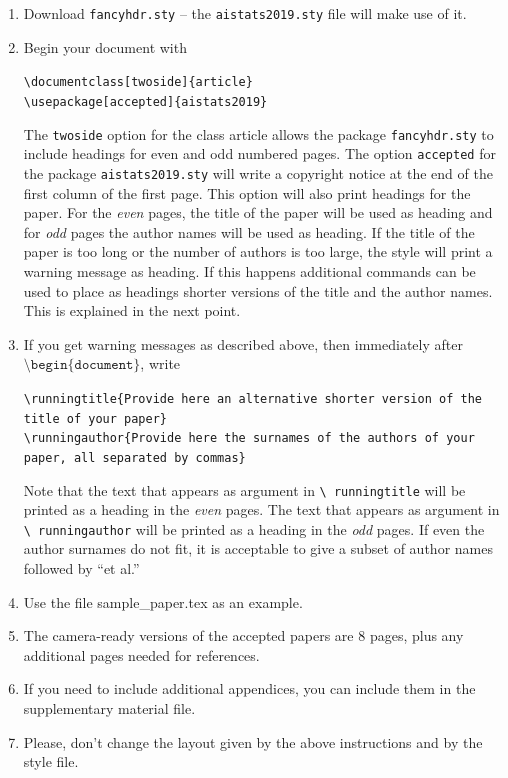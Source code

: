 \documentclass[twoside]{article}
\begin{document}
\begin{enumerate}
    \item Download \texttt{fancyhdr.sty} -- the
    \texttt{aistats2019.sty} file will make use of it.
    \item Begin your document with
    \begin{flushleft}
    \texttt{\textbackslash documentclass[twoside]\{article\}}\\
    \texttt{\textbackslash usepackage[accepted]\{aistats2019\}}
    \end{flushleft}
    The \texttt{twoside} option for the class article allows the
    package \texttt{fancyhdr.sty} to include headings for even and odd
    numbered pages. The option \texttt{accepted} for the package
    \texttt{aistats2019.sty} will write a copyright notice at the end of
    the first column of the first page. This option will also print
    headings for the paper.  For the \emph{even} pages, the title of
    the paper will be used as heading and for \emph{odd} pages the
    author names will be used as heading.  If the title of the paper
    is too long or the number of authors is too large, the style will
    print a warning message as heading. If this happens additional
    commands can be used to place as headings shorter versions of the
    title and the author names. This is explained in the next point.
    \item  If you get warning messages as described above, then
    immediately after $\texttt{\textbackslash
    begin\{document\}}$, write
    \begin{flushleft}
    \texttt{\textbackslash runningtitle\{Provide here an alternative
    shorter version of the title of your paper\}}\\
    \texttt{\textbackslash runningauthor\{Provide here the surnames of
    the authors of your paper, all separated by commas\}}
    \end{flushleft}
    Note that the text that appears as argument in \texttt{\textbackslash
      runningtitle} will be printed as a heading in the \emph{even}
    pages. The text that appears as argument in \texttt{\textbackslash
      runningauthor} will be printed as a heading in the \emph{odd}
    pages.  If even the author surnames do not fit, it is acceptable
    to give a subset of author names followed by ``et al.''

    \item Use the file sample\_paper.tex as an example.

    \item The camera-ready versions of the accepted papers are 8
      pages, plus any additional pages needed for references.

    \item If you need to include additional appendices,
      you can include them in the supplementary
      material file.

    \item Please, don't change the layout given by the above
      instructions and by the style file.

\end{enumerate}
\end{document}
